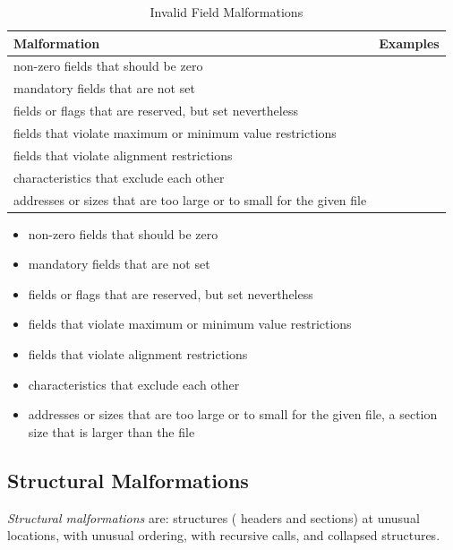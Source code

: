 \renewcommand{\arraystretch}{1.5}
\begin{table}[h]
	\begin{center}
	\caption[Invalid Field Malformations]{Invalid Field Malformations}
	\label{tbl:invalidmalformation}
		\begin{tabular}{p{} p{} }
			\toprule
			Malformation			& Examples\\
			\midrule
      non-zero fields that should be zero & \\
      mandatory fields that are not set & \\
      fields or flags that are reserved, but set nevertheless & \\
      fields that violate maximum or minimum value restrictions & \\
      fields that violate alignment restrictions & \\
      characteristics that exclude each other & \\
      addresses or sizes that are too large or to small for the given file & \\
			\bottomrule
		\end{tabular}
	\end{center}
\end{table}

\begin{itemize}
\item non-zero fields that should be zero
\item mandatory fields that are not set
\item fields or flags that are reserved, but set nevertheless
\item fields that violate maximum or minimum value restrictions
\item fields that violate alignment restrictions
\item characteristics that exclude each other
\item addresses or sizes that are too large or to small for the given file, \eg{} a section size that is larger than the file
\end{itemize}

\subsection{Structural Malformations}

\begin{definition}
\emph{Structural malformations} are: \PE{} structures (\ie{} headers and sections) at unusual locations, with unusual ordering, with recursive calls, and collapsed structures.
\end{definition} 

